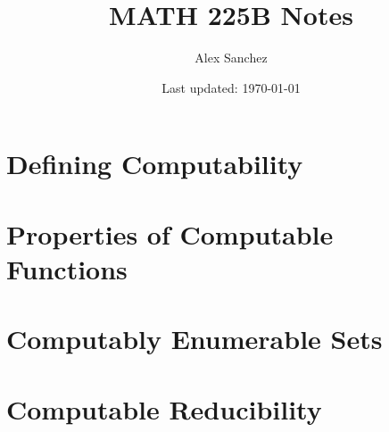 \documentclass{book}
\title{MATH 225B Notes}
\author{Alex Sanchez}
\date{Last updated: \today}
\begin{document}
\maketitle

\chapter{Defining Computability}




\chapter{Properties of Computable Functions}



\chapter{Computably Enumerable Sets}

\chapter{Computable Reducibility}
\end{document}
